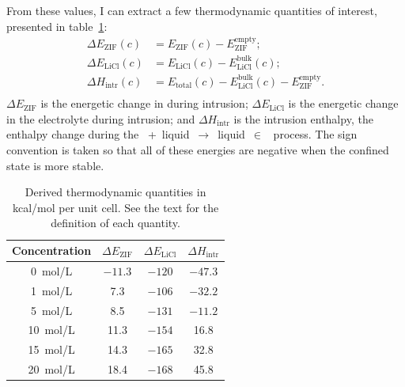 \documentclass[thesis]{subfiles}
\begin{document}
From these values, I can extract a few thermodynamic quantities of interest,
presented in table~\ref{table:thermo}:
\[\begin{aligned}
    \Delta E_\text{ZIF} (c)  &= E_\text{ZIF}(c) - E_\text{ZIF}^\text{empty};\\
    \Delta E_\text{LiCl} (c) &= E_\text{LiCl}(c) - E_\text{LiCl}^\text{bulk}(c);\\
    \Delta H_\text{intr} (c) &= E_\text{total}(c) - E_\text{LiCl}^\text{bulk}(c) - E_\text{ZIF}^\text{empty}.\\
\end{aligned}\]
$\Delta E_\text{ZIF}$ is the energetic change in  during intrusion; $\Delta
E_\text{LiCl}$ is the energetic change in the electrolyte during intrusion; and
$\Delta H_\text{intr}$ is the intrusion enthalpy, \emph{\ie} the enthalpy
change during the \mbox{ + liquid $\rightarrow$ liquid $\in$
} process. The sign convention is taken so that all of these energies are
negative when the confined state is more stable.

\begin{table}[ht]
    \caption{Derived thermodynamic quantities in kcal/mol per unit cell. See
    the text for the definition of each quantity.}
    \label{table:thermo}
    \centering
    \renewcommand{\arraystretch}{1.3}
    \begin{tabular}{c | c c c }
        \toprule
        Concentration  & $\Delta E_\text{ZIF}$ & $\Delta E_\text{LiCl}$ & $\Delta H_\text{intr}$ \\
        \midrule
        \SI{0}{mol/L}  &    $-11.3$            &    $-120$                &    $-47.3$               \\
        \SI{1}{mol/L}  &       7.3             &    $-106$                &    $-32.2$               \\
        \SI{5}{mol/L}  &       8.5             &    $-131$                &    $-11.2$               \\
        \SI{10}{mol/L} &      11.3             &    $-154$                &     16.8               \\
        \SI{15}{mol/L} &      14.3             &    $-165$                &     32.8               \\
        \SI{20}{mol/L} &      18.4             &    $-168$                &     45.8               \\
        \bottomrule
    \end{tabular}
\end{table}
\end{document}
